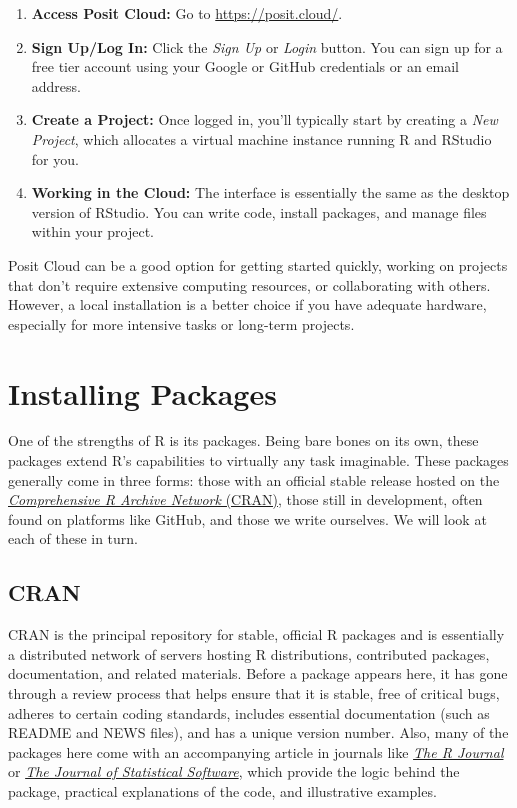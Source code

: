 \documentclass[
]{book}
\providecommand{\tightlist}{%
  \setlength{\itemsep}{0pt}\setlength{\parskip}{0pt}}
\begin{document}
\begin{enumerate}
\def\labelenumi{\arabic{enumi}.}
\tightlist
\item
  \textbf{Access Posit Cloud:} Go to \url{https://posit.cloud/}.
\item
  \textbf{Sign Up/Log In:} Click the \emph{Sign Up} or \emph{Login} button. You can sign up for a free tier account using your Google or GitHub credentials or an email address.
\item
  \textbf{Create a Project:} Once logged in, you'll typically start by creating a \emph{New Project}, which allocates a virtual machine instance running R and RStudio for you.
\item
  \textbf{Working in the Cloud:} The interface is essentially the same as the desktop version of RStudio. You can write code, install packages, and manage files within your project.
\end{enumerate}

Posit Cloud can be a good option for getting started quickly, working on projects that don't require extensive computing resources, or collaborating with others. However, a local installation is a better choice if you have adequate hardware, especially for more intensive tasks or long-term projects.

\section{Installing Packages}\label{installing-packages}

One of the strengths of R is its packages. Being bare bones on its own, these packages extend R's capabilities to virtually any task imaginable. These packages generally come in three forms: those with an official stable release hosted on the \href{https://cran.r-project.org/}{\emph{Comprehensive R Archive Network} (CRAN)}, those still in development, often found on platforms like GitHub, and those we write ourselves. We will look at each of these in turn.

\subsection{CRAN}\label{cran}

CRAN is the principal repository for stable, official R packages and is essentially a distributed network of servers hosting R distributions, contributed packages, documentation, and related materials. Before a package appears here, it has gone through a review process that helps ensure that it is stable, free of critical bugs, adheres to certain coding standards, includes essential documentation (such as README and NEWS files), and has a unique version number. Also, many of the packages here come with an accompanying article in journals like \href{https://journal.r-project.org/}{\emph{The R Journal}} or \href{https://www.jstatsoft.org/index}{\emph{The Journal of Statistical Software}}, which provide the logic behind the package, practical explanations of the code, and illustrative examples.
\end{document}
